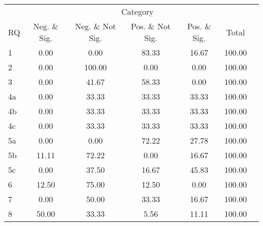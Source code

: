 \begin{tabular}{lcccccc}
\hline
\hline
 & \multicolumn{5}{c}{Category} \\
RQ&Neg. \& Sig.&Neg. \& Not Sig.&Pos. \& Not Sig.&Pos. \& Sig.&Total \\
%
\hline
1&0.00&0.00&83.33&16.67&100.00 \\
2&0.00&100.00&0.00&0.00&100.00 \\
3&0.00&41.67&58.33&0.00&100.00 \\
4a&0.00&33.33&33.33&33.33&100.00 \\
4b&0.00&33.33&33.33&33.33&100.00 \\
4c&0.00&33.33&33.33&33.33&100.00 \\
5a&0.00&0.00&72.22&27.78&100.00 \\
5b&11.11&72.22&0.00&16.67&100.00 \\
5c&0.00&37.50&16.67&45.83&100.00 \\
6&12.50&75.00&12.50&0.00&100.00 \\
7&0.00&50.00&33.33&16.67&100.00 \\
8&50.00&33.33&5.56&11.11&100.00 \\
\hline
\hline
\end{tabular}
